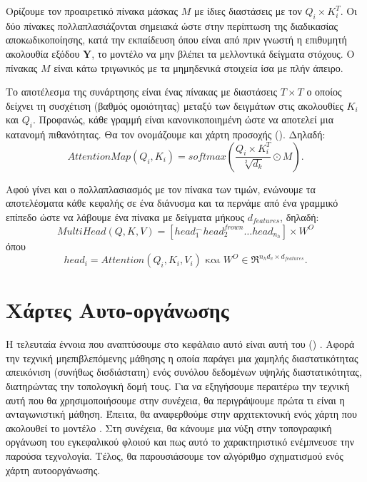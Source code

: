   Ορίζουμε τον προαιρετικό πίνακα μάσκας $M$ με ίδιες διαστάσεις με τον $Q_i\times K_i^T$. Οι δύο πίνακες πολλαπλασιάζονται σημειακά ώστε στην περίπτωση της διαδικασίας αποκωδικοποίησης, κατά την εκπαίδευση όπου είναι από πριν γνωστή η επιθυμητή ακολουθία εξόδου $\boldsymbol{Y}$, το μοντέλο να μην βλέπει τα μελλοντικά δείγματα στόχους. Ο πίνακας $M$ είναι κάτω τριγωνικός με τα μη\textendash μηδενικά στοιχεία ίσα με πλήν άπειρο.\par
  
  Το αποτέλεσμα της συνάρτησης  είναι ένας πίνακας με διαστάσεις $T \times T$ ο οποίος δείχνει τη συσχέτιση (βαθμός ομοιότητας) μεταξύ των δειγμάτων στις ακολουθίες $K_i$ και $Q_i$. Προφανώς, κάθε γραμμή είναι κανονικοποιημένη ώστε να αποτελεί μια κατανομή πιθανότητας. Θα τον ονομάζουμε και χάρτη προσοχής (). Δηλαδή:
  \[
    AttentionMap(Q_i, K_i) = softmax(\frac{Q_i\times K_i^T}{\sqrt[2]{d_k}} \odot  M).
    \]
  
  Αφού γίνει και ο πολλαπλασιασμός με τον πίνακα των τιμών, ενώνουμε τα αποτελέσματα κάθε κεφαλής σε ένα διάνυσμα και τα περνάμε από ένα γραμμικό επίπεδο ώστε να λάβουμε ένα πίνακα με δείγματα μήκους $d_{features}$, δηλαδή: 
  \begin{equation}
    MultiHead(Q, K, V) = [ head_1^{\frown}head_2^{frown}\dots head_{n_h} ] \times W^O
  \end{equation}
  όπου 
  \[
    head_i = Attention(Q_i, K_i, V_i) \text{ και } W^O \in \Re^{n_h d_v \times d_{features}}.
  \]



 

\section{Χάρτες Αυτο-οργάνωσης}
\label{sec:_SOM}
Η τελευταία έννοια που αναπτύσουμε στο κεφάλαιο αυτό είναι αυτή του  () \cite{kohonen1982self, kohonen1990self}. Αφορά την τεχνική μη\textendash επιβλεπόμενης μάθησης η οποία παράγει μια χαμηλής διαστατικότητας απεικόνιση (συνήθως δισδιάστατη) ενός συνόλου δεδομένων υψηλής διαστατικότητας, διατηρώντας την τοπολογική δομή τους. Για να εξηγήσουμε περαιτέρω την τεχνική αυτή που θα χρησιμοποιήσουμε στην συνέχεια, θα περιγράψουμε πρώτα τι είναι η ανταγωνιστική μάθηση. Έπειτα, θα αναφερθούμε στην αρχιτεκτονική ενός χάρτη που ακολουθεί το μοντέλο . Στη συνέχεια, θα κάνουμε μια νύξη στην τοπογραφική οργάνωση του εγκεφαλικού φλοιού και πως αυτό το χαρακτηριστικό ενέμπνευσε την παρούσα τεχνολογία. Τέλος, θα παρουσιάσουμε τον αλγόριθμο σχηματισμού ενός χάρτη αυτο\textendash οργάνωσης.

